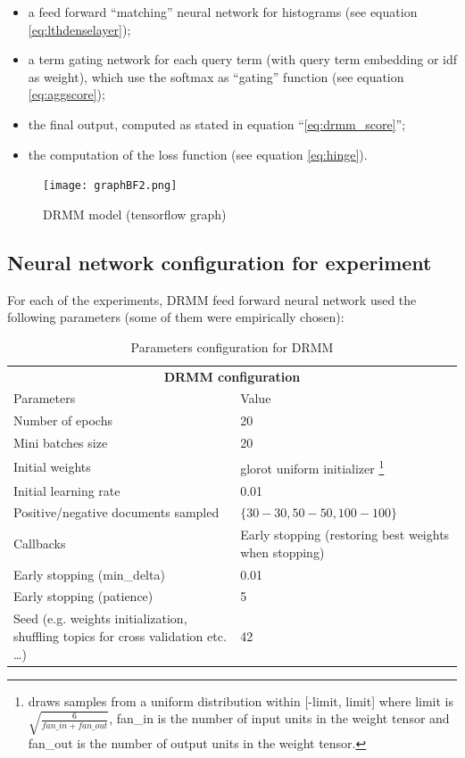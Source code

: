 \begin{itemize}
 \item a feed forward ``matching'' neural network for histograms (see equation \ref{eq:lthdenselayer});
 \item a term gating network for each query term (with query term embedding or idf as weight), which use the softmax as ``gating'' function (see equation \ref{eq:aggscore});
 \item the final output, computed as stated in equation ``\ref{eq:drmm_score}'';
 \item the computation of the loss function (see equation \ref{eq:hinge}).
\end{itemize}

\begin{figure}[H]
  \centering
  \texttt{[image: graphBF2.png]}
  \caption{DRMM model (tensorflow graph)}
  \label{fig:model_drmm}
\end{figure}

\subsection{Neural network configuration for experiment}

For each of the experiments, DRMM feed forward neural network used the following parameters (some of them were empirically chosen):

\begin{table}[H]
\centering
\begin{tabular}{p{8cm}|p{5cm}}
\multicolumn{2}{c}{\textbf{DRMM configuration}} \\
Parameters & Value \\ \hline
Number of epochs & 20 \\
Mini batches size & 20 \\
Initial weights & glorot uniform initializer \footnote{draws samples from a uniform distribution within [-limit, limit] where limit is $\sqrt{\frac{6}{fan\_in + fan\_out}}$, fan\_in is the number of input units in the weight tensor and fan\_out is the number of output units in the weight tensor.} \\
Initial learning rate & 0.01 \\
Positive/negative documents sampled & $\{30-30, 50-50, 100-100\}$ \\
Callbacks & Early stopping (restoring best weights when stopping) \\
Early stopping (min\_delta) & 0.01 \\
Early stopping (patience) & 5 \\
Seed (e.g. weights initialization, shuffling topics for cross validation etc. \dots) & 42
\end{tabular}
\caption{Parameters configuration for DRMM}
\label{table:drmm_config}
\end{table}

